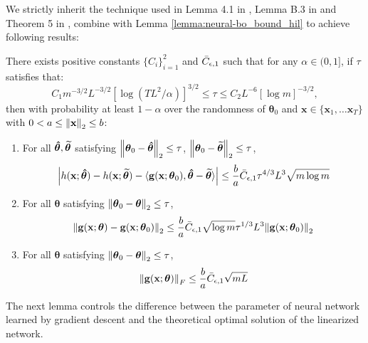We strictly inherit the technique used in Lemma 4.1 in \citet{cao2019generalization}, Lemma B.3 in \citet{cao2019generalization} and Theorem 5 in \citet{allen2019convergence}, combine with Lemma \ref{lemma:neural-bo_bound_hil} to achieve following results:
\begin{auxlemma}
\label{lemma:NTK_related_bounds}
There exists positive constants $\{C_i\}^2_{i=1}$ and $\Bar{C}_{\epsilon,1}$ such that for any $\alpha  \in (0,1]$, if $\tau$ satisfies that:
\[C_{1}m^{-3/2}L^{-3/2}\left[\log(T L^2/\alpha)\right]^{3/2}\leq\tau\leq C_{2}L^{-6}[\log m]^{-3/2},\] then with probability at least $1-\alpha$ over the randomness of $\boldsymbol{\theta}_0$ and $\mathbf{x} \in \{\mathbf{x}_1, \dots \mathbf{x}_T\}$ with $0<  a \le \norm{\mathbf{x}}_2 \le b$:
\begin{enumerate}
    \item For all  $\boldsymbol{\Hat{\theta}}, \boldsymbol{\widetilde{\theta}}$  satisfying $\norm{\boldsymbol{\theta}_0 -  \boldsymbol{\Hat{\theta}}}_2 \le \tau$, $\norm{\boldsymbol{\theta}_0 -  \boldsymbol{\widetilde{\theta}}}_2 \leq \tau$, 
    \[\left \lvert h(\mathbf{x};\boldsymbol{\Hat \theta}) - h(\mathbf{x}; \boldsymbol{\widetilde{\theta}}) - \langle \mathbf{g}(\mathbf{x}; \boldsymbol{\theta}_0), \boldsymbol{\Hat \theta} - \boldsymbol{\widetilde{\theta}} \rangle  \right\rvert  \leq  \frac{b}{a} \Bar{C}_{\epsilon,1}   \tau^{4/3}L^{3}\sqrt{m\log m}\]
    \label{res:true_f_vs_linear}
    
    \item For all  $\boldsymbol{\theta}$  satisfying $\norm{\boldsymbol{\theta}_0 -  \boldsymbol{\theta}}_2 \le \tau$, 
    \[ \norm{\mathbf{g}(\mathbf{x}; \boldsymbol{\theta}) - \mathbf{g}(\mathbf{x}; \boldsymbol{\theta}_0)}_2 \leq \frac{b}{a} \Bar{C}_{\epsilon,1} \sqrt{\log m}\tau^{1/3}L^{3} \norm{\mathbf{g}(\mathbf{x};\boldsymbol{\theta}_0)}_2\]
    
    \label{res:grad_diff_bound}
    
    \item For all  $\boldsymbol{\theta}$  satisfying $\norm{\boldsymbol{\theta}_0 -  \boldsymbol{\theta}}_2 \le \tau$, 
    \[\norm{\mathbf{g}(\mathbf{x};\boldsymbol{\theta})}_F \leq \frac{b}{a} \Bar{C}_{\epsilon,1} \sqrt{mL}\] 
    
    \label{res:grad_bound}
\end{enumerate}
\end{auxlemma}
The next lemma controls the difference between the
parameter of neural network learned by gradient descent and the theoretical optimal solution of the linearized network. 



